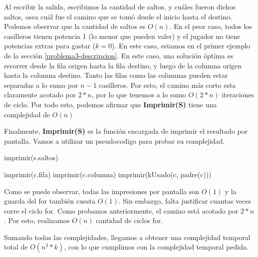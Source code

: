 Al escribir la salida, escribimos la cantidad de saltos, y cuáles fueron dichos saltos, osea cuál fue el camino que se tomó desde el inicio hasta el destino. Podemos observar que la cantidad de saltos es $O(n)$. En el peor caso, todos los casilleros tienen potencia 1 (lo menor que pueden valer) y el jugador no tiene potencias extras para gastar ($k=0$). En este caso, estamos en el primer ejemplo de la sección  \ref{problema3-descripcion}. En este caso, una solución óptima es recorrer desde la fila origen hasta la fila destino, y luego de la columna origen hasta la columna destino. Tanto las filas como las columnas pueden estar separadas a lo sumo por $n-1$ casilleros. Por esto, el camino más corto esta claramente acotado por $2*n$, por lo que tenemos a lo sumo $O(2*n)$ iteraciones de ciclo. Por todo esto, podemos afirmar que \textbf{Imprimir(S)} tiene una complejidad de $O(n)$

Finalmente, \textbf{Imprimir(S)} es la función encargada de imprimir el resultado por pantalla. Vamos a utilizar un pseudocodigo para probar su complejidad.

\begin{pseudo}
        \State imprimir(s.saltos) 

		 
        \State imprimir(c.fila) 
        \State imprimir(c.columna) 
        \State imprimir(kUsado(c, padre(c))) 
        
      	\EndFor
        
    \EndProcedure
\end{pseudo}

Como se puede observar, todas las impresiones por pantalla son $O(1)$ y la guarda del for también cuesta $O(1)$. Sin embargo, falta justificar cuantas veces corre el ciclo for. Como probamos anteriormente, el camino está acotado por $2*n$. Por esto, realizamos $O(n)$ cantidad de ciclos for.

Sumando todas las complejidades, llegamos a obtener una complejidad temporal total de $O(n^3 * k)$, con lo que cumplimos con la complejidad temporal pedida.